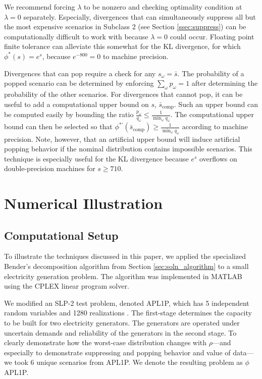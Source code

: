 \documentclass[opre,nonblindrev]{informs3} %
\begin{document}
We recommend forcing $\lambda$ to be nonzero and checking optimality condition at $\lambda = 0$ separately.
Especially, divergences that can simultaneously suppress all but the most expensive scenarios in Subclass 2 (see Section \ref{ssec:suppress}) can be computationally difficult to work with because $\lambda = 0$ could occur.
Floating point finite tolerance can alleviate this somewhat for the KL divergence, for which $\phi^*(s) = e^s$, because $e^{-800} = 0$ to machine precision.


Divergences that can pop require a check for any $s_\omega = \bar{s}$.
The probability of a popped scenario can be determined by enforcing $\sum_\omega p_\omega = 1$ after determining the probability of the other scenarios.
%
For divergences that cannot pop, it can be useful to add a computational upper bound on $s$, $\bar{s}_\text{comp}$.
Such an upper bound can be computed easily by bounding the ratio $\frac{p_\omega}{q_\omega} \leq \frac{1}{\min_\omega q_\omega}$.
The computational upper bound can then be selected so that $\phi^{*\prime}(\bar{s}_\text{comp}) \geq \frac{1}{\min_\omega q_\omega}$ according to machine precision.
Note, however, that an artificial upper bound will induce artificial popping behavior if the nominal distribution contains impossible scenarios.
This technique is especially useful for the KL divergence because $e^s$ overflows on double-precision machines for $s \geq 710$.



\section{Numerical Illustration} 
\label{sec:comp_results}

\subsection{Computational Setup}
\label{ssec:csetup}

To illustrate the techniques discussed in this paper, we applied the specialized Bender's decomposition algorithm from Section \ref{sec:soln_algorithm} to a small electricity generation problem.
The algorithm was implemented in MATLAB using the CPLEX linear program solver. 

We modified an SLP-2 test problem, denoted APL1P, which has 5 independent random variables and 1280 realizations \citep{infanger1992monte}.
The first-stage determines the capacity to be built for two electricity generators.
The generators are operated under uncertain demands and reliability of the generators in the second stage.
To clearly demonstrate how the worst-case distribution changes with $\rho$---and especially to demonstrate suppressing and popping behavior and value of data---we took 6 unique scenarios from APL1P. 
We denote the resulting problem as $\phi$APL1P.
 
\end{document}
